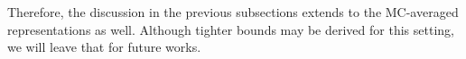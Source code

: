 Therefore, the discussion in the previous subsections extends to the MC-averaged representations as well. Although tighter bounds may be derived for this setting, we will leave that for future works.

